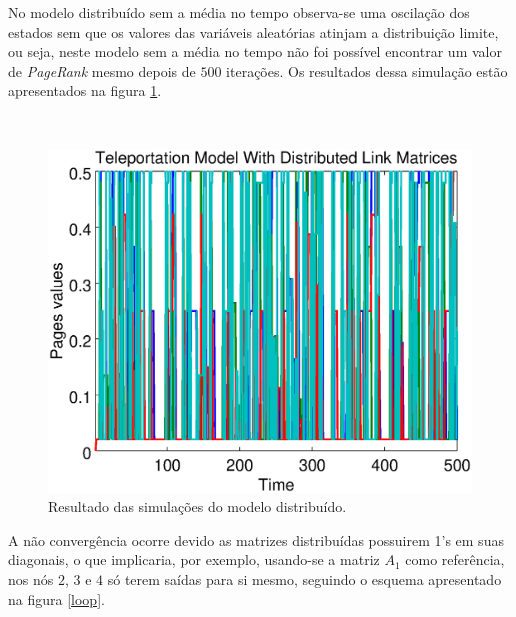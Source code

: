 \documentclass[a4paper]{report} %
\begin{document}
No modelo distribuído sem a média no tempo observa-se uma oscilação dos estados sem que os valores das variáveis aleatórias atinjam a distribuição limite, ou seja, neste modelo sem a média no tempo não foi possível encontrar um valor de \textit{PageRank} mesmo depois de $500$ iterações. Os resultados dessa simulação estão apresentados na figura \ref{teledistributed}.

\
\begin{figure}[!htb]
	\centering
	\includegraphics[scale=0.3]{imagens/teledistributed}
	\caption{Resultado das simulações do modelo distribuído.}
	\label{teledistributed}
\end{figure}

A não convergência ocorre devido as matrizes distribuídas possuirem 1's em suas diagonais, o que implicaria, por exemplo, usando-se a matriz $A_1$ como referência, nos nós $2$, $3$ e $4$ só terem saídas para si mesmo, seguindo o esquema apresentado na figura \ref{loop}.
\end{document}
